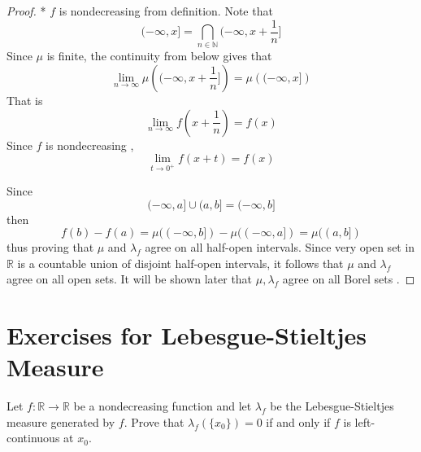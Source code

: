 \documentclass[../main.tex]{subfiles}
\begin{document}
\begin{proof}*
  \(  f  \) is nondecreasing from definition.  Note that \[
  (-\infty,x]= \bigcap_{n \in \mathbb{N} }(-\infty,x+ \frac{1 }{n } ]
  \] Since \(  \mu   \) is finite, the continuity from below gives that  \[
  \lim_{n\to \infty}\mu \left( (-\infty,x+ \frac{1 }{n } ] \right) = \mu\left(  (-\infty,x] \right) 
  \]That is \[
  \lim_{n\to \infty}f\left( x+ \frac{1 }{n }  \right)= f\left( x \right)  
  \] Since \(  f  \) is nondecreasing , \[
  \lim_{t \to 0^{+ }} f\left( x+ t \right)= f\left( x \right)  
  \] 

  Since \[
  (-\infty,a]\cup (a,b]= (-\infty,b]
  \] then \[
  f\left( b \right)-f\left( a \right)= \mu ((-\infty,b])-\mu ((-\infty,a])= \mu ((a,b])
  \] thus proving that \(  \mu   \) and \(   \lambda _{f}  \) agree on all half-open intervals.   Since very open set in \(  \mathbb{R}   \) is  a countable union of disjoint half-open intervals, it follows that \(  \mu   \) and \(   \lambda _{f}  \) agree on all open sets.   It will be shown later that \(  \mu , \lambda _{f}  \) agree on all Borel sets . 
\end{proof}

\section*{Exercises for Lebesgue-Stieltjes Measure}

\begin{exercise}{}{}
Let $f: \mathbb{R} \to \mathbb{R}$ be a nondecreasing function and let $\lambda_f$ be the Lebesgue-Stieltjes measure generated by $f$. Prove that $\lambda_f(\{x_0\}) = 0$ if and only if $f$ is left-continuous at $x_0$.
\end{exercise}
\end{document}
